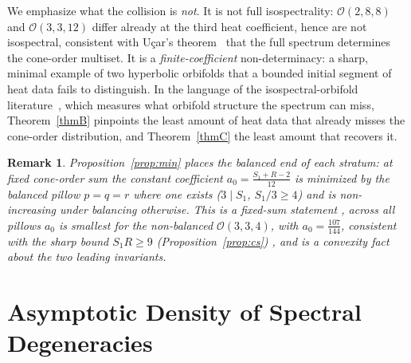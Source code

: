 \documentclass[12pt, letterpaper]{article}
\theoremstyle{definition}
\theoremstyle{plain}
\newtheorem*{remark*}{Remark}
\begin{document}
We emphasize what the collision is \emph{not}. It is not full isospectrality: $\mathcal{O}(2,8,8)$ and $\mathcal{O}(3,3,12)$ differ already at the third heat coefficient, hence are not isospectral, consistent with U\c{c}ar's theorem~\cite{ucar2017} that the full spectrum determines the cone-order multiset. It is a \emph{finite-coefficient} non-determinacy: a sharp, minimal example of two hyperbolic orbifolds that a bounded initial segment of heat data fails to distinguish. In the language of the isospectral-orbifold literature~\cite{ssw2006, rsw2008, barihunsicker2017}, which measures what orbifold structure the spectrum can miss, Theorem~\ref{thmB} pinpoints the least amount of heat data that already misses the cone-order distribution, and Theorem~\ref{thmC} the least amount that recovers it.

\begin{remark*}
Proposition~\ref{prop:min} places the balanced end of each stratum: at fixed cone-order sum the constant coefficient $a_0=\tfrac{S_1+R-2}{12}$ is minimized by the balanced pillow $p=q=r$ where one exists ($3\mid S_1$, $S_1/3\ge4$) and is non-increasing under balancing otherwise. This is a fixed-sum statement ,  across \emph{all} pillows $a_0$ is smallest for the non-balanced $\mathcal{O}(3,3,4)$, with $a_0=\tfrac{107}{144}$, consistent with the sharp bound $S_1R\ge9$ (Proposition~\ref{prop:cs}) ,  and is a convexity fact about the two leading invariants.
\end{remark*}

\newpage
\section{Asymptotic Density of Spectral Degeneracies}
\label{sec:density}
\end{document}

